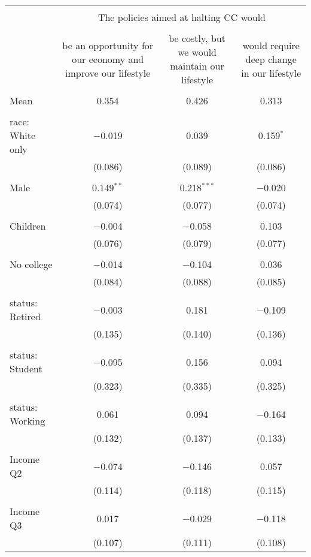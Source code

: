
\begin{tabular}{@{\extracolsep{5pt}}lccc} 
\\[-1.8ex]\hline 
\hline \\[-1.8ex] 
 & \multicolumn{3}{c}{The policies aimed at halting CC would } \\ 
\cline{2-4} 
\\[-1.8ex] & be an opportunity for our economy and improve our lifestyle & be costly, but we would maintain our lifestyle & would require deep change in our lifestyle \\ 
\hline \\[-1.8ex] 
 Mean & 0.354 & 0.426 & 0.313  \\ \hline \\[-1.8ex] race: White only & $-$0.019 & 0.039 & 0.159$^{*}$ \\ 
  & (0.086) & (0.089) & (0.086) \\ 
  & & & \\ 
 Male & 0.149$^{**}$ & 0.218$^{***}$ & $-$0.020 \\ 
  & (0.074) & (0.077) & (0.074) \\ 
  & & & \\ 
 Children & $-$0.004 & $-$0.058 & 0.103 \\ 
  & (0.076) & (0.079) & (0.077) \\ 
  & & & \\ 
 No college & $-$0.014 & $-$0.104 & 0.036 \\ 
  & (0.084) & (0.088) & (0.085) \\ 
  & & & \\ 
 status: Retired & $-$0.003 & 0.181 & $-$0.109 \\ 
  & (0.135) & (0.140) & (0.136) \\ 
  & & & \\ 
 status: Student & $-$0.095 & 0.156 & 0.094 \\ 
  & (0.323) & (0.335) & (0.325) \\ 
  & & & \\ 
 status: Working & 0.061 & 0.094 & $-$0.164 \\ 
  & (0.132) & (0.137) & (0.133) \\ 
  & & & \\ 
 Income Q2 & $-$0.074 & $-$0.146 & 0.057 \\ 
  & (0.114) & (0.118) & (0.115) \\ 
  & & & \\ 
 Income Q3 & 0.017 & $-$0.029 & $-$0.118 \\ 
  & (0.107) & (0.111) & (0.108) \\ 

\end{tabular}
